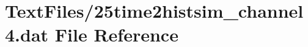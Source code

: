 \hypertarget{25time2histsim__channel4_8dat}{}\section{Text\+Files/25time2histsim\+\_\+channel4.dat File Reference}
\label{25time2histsim__channel4_8dat}
